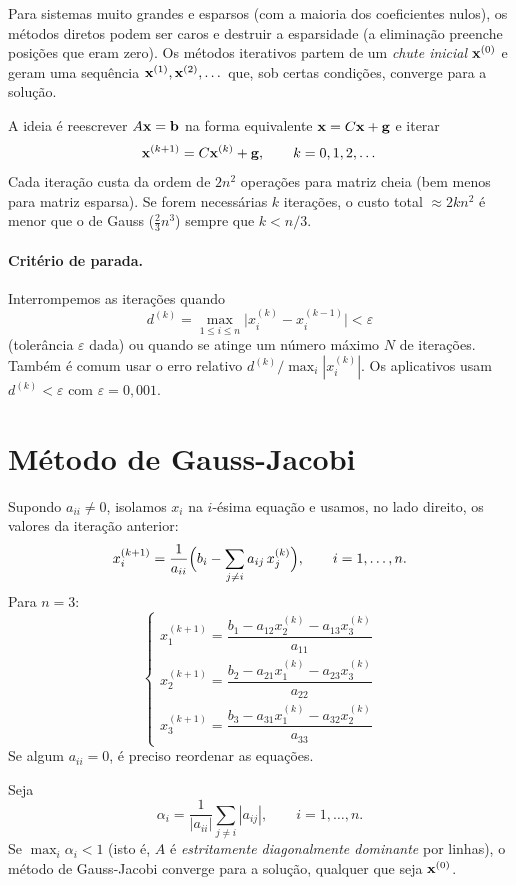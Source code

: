 Para sistemas muito grandes e esparsos (com a maioria dos coeficientes nulos), os métodos
diretos podem ser caros e destruir a esparsidade (a eliminação preenche posições que eram
zero). Os métodos iterativos partem de um \emph{chute inicial} $\mathbf{x}^{(0)}$ e geram uma
sequência $\mathbf{x}^{(1)},\mathbf{x}^{(2)},\dots$ que, sob certas condições, converge para a solução.

A ideia é reescrever $A\mathbf{x}=\mathbf{b}$ na forma equivalente $\mathbf{x}=C\mathbf{x}+\mathbf g$ e iterar
\[
\mathbf{x}^{(k+1)}=C\mathbf{x}^{(k)}+\mathbf g,\qquad k=0,1,2,\dots
\]
Cada iteração custa da ordem de $2n^2$ operações para matriz cheia (bem menos para matriz
esparsa). Se forem necessárias $k$ iterações, o custo total $\approx2kn^2$ é menor que o de
Gauss ($\frac23n^3$) sempre que $k<n/3$.

\paragraph{Critério de parada.} Interrompemos as iterações quando
\[
d^{(k)}=\max_{1\le i\le n}\bigl|x_i^{(k)}-x_i^{(k-1)}\bigr|<\varepsilon
\]
(tolerância $\varepsilon$ dada) ou quando se atinge um número máximo $N$ de iterações. Também
é comum usar o erro relativo $d^{(k)}/\max_i|x_i^{(k)}|$. Os aplicativos usam $d^{(k)}<\varepsilon$
com $\varepsilon=0{,}001$.

\section{Método de Gauss-Jacobi}

Supondo $a_{ii}\neq0$, isolamos $x_i$ na $i$-ésima equação e usamos, no lado direito, os
valores da iteração anterior:
\[
x_i^{(k+1)}=\frac{1}{a_{ii}}\Bigl(b_i-\sum_{j\neq i}a_{ij}\,x_j^{(k)}\Bigr),\qquad i=1,\dots,n.
\]
Para $n=3$:
\[
\begin{cases}
x_1^{(k+1)}=\dfrac{b_1-a_{12}x_2^{(k)}-a_{13}x_3^{(k)}}{a_{11}}\\[8pt]
x_2^{(k+1)}=\dfrac{b_2-a_{21}x_1^{(k)}-a_{23}x_3^{(k)}}{a_{22}}\\[8pt]
x_3^{(k+1)}=\dfrac{b_3-a_{31}x_1^{(k)}-a_{32}x_2^{(k)}}{a_{33}}
\end{cases}
\]
Se algum $a_{ii}=0$, é preciso reordenar as equações.

\begin{teorema}
Seja
\[
\alpha_i=\frac{1}{|a_{ii}|}\sum_{j\neq i}|a_{ij}|,\qquad i=1,\dots,n.
\]
Se $\displaystyle\max_i\alpha_i<1$ (isto é, $A$ é \emph{estritamente diagonalmente dominante}
por linhas), o método de Gauss-Jacobi converge para a solução, qualquer que seja $\mathbf{x}^{(0)}$.
\end{teorema}

